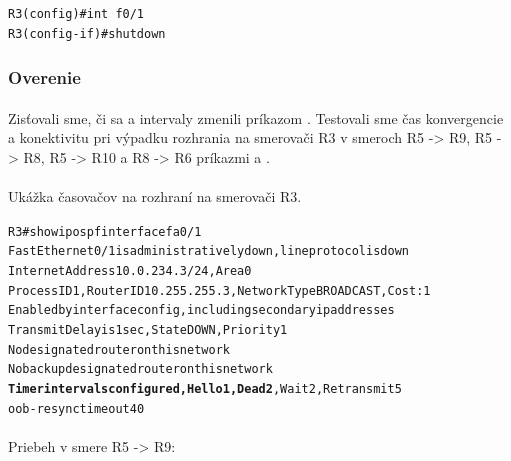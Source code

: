 \documentclass[12pt,twoside,a4paper]{report}
\begin{document}
\noindent
{\selectfont
\begin{small}
\begin{verbatim}
R3(config)#int f0/1
R3(config-if)#shutdown

\end{verbatim}
\end{small}
}


\subsubsection{Overenie}
\paragraph{}
Zisťovali sme, či sa  a  intervaly zmenili príkazom . Testovali sme čas konvergencie a konektivitu pri výpadku rozhrania  na smerovači R3 v smeroch R5 -\textgreater{} R9, R5 -\textgreater{} R8, R5 -\textgreater{} R10 a R8 -\textgreater{} R6 príkazmi  a .


\paragraph{}
Ukážka časovačov na rozhraní  na smerovači R3.
\noindent
{\selectfont
\begin{small}
\begin{alltt}
R3#show ip ospf interface fa0/1
FastEthernet0/1 is administratively down, line protocol is down 
  Internet Address 10.0.234.3/24, Area 0 
  Process ID 1, Router ID 10.255.255.3, Network Type BROADCAST, Cost: 1
  Enabled by interface config, including secondary ip addresses
  Transmit Delay is 1 sec, State DOWN, Priority 1
  No designated router on this network
  No backup designated router on this network
  \textbf{Timer intervals configured, Hello 1, Dead 2}, Wait 2, Retransmit 5
    oob-resync timeout 40
\end{alltt}
\end{small}
}


\paragraph{}
Priebeh  v smere R5 -\textgreater{} R9:
\end{document}

